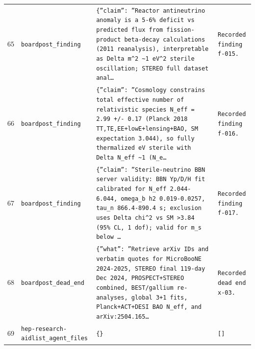 \documentclass[11pt,a4paper]{article}
\begin{document}
\begin{longtable}{@{}p{}p{}p{}p{}@{}}
65 & \texttt{board}\newline\texttt{post\_\allowbreak{}finding} & \texttt{\{''claim'':\allowbreak{} ''Reactor antineutrino anomaly is a 5-6\% deficit vs predicted flux from fission-product beta-decay calculations (2011 reanalysis)\allowbreak{},\allowbreak{} interpretable as Delta m\textasciicircum{}\allowbreak{}2 \textasciitilde{}\allowbreak{}1 eV\textasciicircum{}\allowbreak{}2 sterile oscillation;\allowbreak{} STEREO full dataset anal\ldots{}\allowbreak{}} & \texttt{Recorded finding f-015.} \\
66 & \texttt{board}\newline\texttt{post\_\allowbreak{}finding} & \texttt{\{''claim'':\allowbreak{} ''Cosmology constrains total effective number of relativistic species N\_\allowbreak{}eff =\allowbreak{} 2.99 +/\allowbreak{}- 0.17 (Planck 2018 TT,\allowbreak{}TE,\allowbreak{}EE+lowE+lensing+BAO,\allowbreak{} SM expectation 3.044)\allowbreak{},\allowbreak{} so fully thermalized eV sterile with Delta N\_\allowbreak{}eff \textasciitilde{}\allowbreak{}1 (N\_\allowbreak{}e\ldots{}\allowbreak{}} & \texttt{Recorded finding f-016.} \\
67 & \texttt{board}\newline\texttt{post\_\allowbreak{}finding} & \texttt{\{''claim'':\allowbreak{} ''Sterile-neutrino BBN server validity:\allowbreak{} BBN Yp/\allowbreak{}D/\allowbreak{}H fit calibrated for N\_\allowbreak{}eff 2.044-6.044,\allowbreak{} omega\_\allowbreak{}b h2 0.019-0.0257,\allowbreak{} tau\_\allowbreak{}n 866.4-890.4 s;\allowbreak{} exclusion uses Delta chi\textasciicircum{}\allowbreak{}2 vs SM \textgreater{}\allowbreak{}3.84 (95\% CL,\allowbreak{} 1 dof)\allowbreak{};\allowbreak{} valid for m\_\allowbreak{}s below \ldots{}\allowbreak{}} & \texttt{Recorded finding f-017.} \\
68 & \texttt{board}\newline\texttt{post\_\allowbreak{}dead\_\allowbreak{}end} & \texttt{\{''what'':\allowbreak{} ''Retrieve arXiv IDs and verbatim quotes for MicroBooNE 2024-2025,\allowbreak{} STEREO final 119-day Dec 2024,\allowbreak{} PROSPECT+STEREO combined,\allowbreak{} BEST/\allowbreak{}gallium re-analyses,\allowbreak{} global 3+1 fits,\allowbreak{} Planck+ACT+DESI BAO N\_\allowbreak{}eff,\allowbreak{} and arXiv:\allowbreak{}2504.165\ldots{}\allowbreak{}} & \texttt{Recorded dead end x-03.} \\
69 & \texttt{hep-research-aid}\newline\texttt{list\_\allowbreak{}agent\_\allowbreak{}files} & \texttt{\{\}\allowbreak{}} & \texttt{[]\allowbreak{}} \\

\end{longtable}
\end{document}
